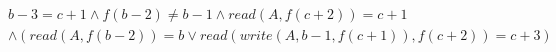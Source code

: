 \begin{align*}
%
& %
b - 3 = c + 1
%
\land
%
f(b - 2)  \neq  b - 1
%
\land
%
\mathit{read}(A,f(c + 2)) = c + 1
~\\~
& %
%
\land
%
(\mathit{read}(A,f(b - 2)) = b \lor \mathit{read}(\mathit{write}(A,b - 1,f(c + 1)),f(c + 2)) = c + 3)
%
\end{align*}
